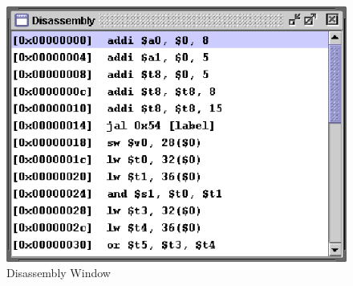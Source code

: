 \documentclass[]{spie}
\begin{document}
\begin{center}
\begin{figure}[H]
\begin{center}
\begin{minipage}[H]{2.4in}
	\end{minipage}
	\ 
	\begin{minipage}[H]{2.7in}
		\begin{center}
			\includegraphics{graphics/DisassemblyWindow.eps}			
		\end{center}
		\caption{\label{fig:Disassembly}Disassembly Window}
	\end{minipage}	
	\end{center}
\end{figure}
\end{center}
\end{document}
